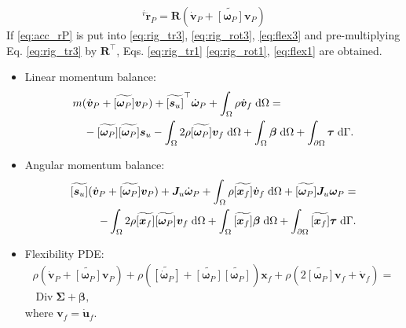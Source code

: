 \documentclass{svjour3}                     %
\DeclareMathOperator*{\Div}{Div}
\newcommand{\crmat}[1]{\ensuremath{\widetilde{\left[#1\right]}}}
\begin{document}
	\begin{equation}
	\label{eq:acc_rP}
	^{i}\ddot{\bm{r}}_P = \bm{R} \left(\dot{\bm{v}}_P + \crmat{\bm{\omega}_P} \bm{v}_P \right)
	\end{equation}
	If \eqref{eq:acc_rP} is put into \eqref{eq:rig_tr3}, \eqref{eq:rig_rot3}, \eqref{eq:flex3} and pre-multiplying  Eq. \eqref{eq:rig_tr3} by $\bm{R}^\top$, Eqs. \eqref{eq:rig_tr1} \eqref{eq:rig_rot1}, \eqref{eq:flex1} are obtained.
	\begin{itemize}
		\item Linear momentum balance:
		\begin{equation}
		\label{eq:rig_tr4}
		\begin{split}
		&m (\dot{\bm{v}}_P + \crmat{\bm{\omega}_P} \bm{v}_P) + \crmat{\bm{s}_u}^\top \dot{\bm{\omega}}_P  + \int_{\Omega} \rho \dot{\bm{v}}_f \d{\Omega} = \\
		&\quad - \crmat{\bm{\omega}_P} \crmat{\bm{\omega}_P} \bm{s}_u - \int_{\Omega} 2 \rho \crmat{\bm{\omega}_P} {\bm{v}}_f \d{\Omega} +  \int_{\Omega} \bm\beta \d{\Omega} + \int_{\partial \Omega} \bm\tau \d{\Gamma}.
		\end{split}
		\end{equation}
		\item Angular momentum balance:
		\begin{equation}
		\label{eq:rig_rot4}
		\begin{split}
		\crmat{\bm{s}_u} (\dot{\bm{v}}_P + \crmat{\bm{\omega}_P} \bm{v}_P) + \bm{J}_u \dot{\bm\omega}_P + \int_{\Omega} \rho \crmat{\bm{x}_f} \dot{\bm{v}}_f \d{\Omega} + \crmat{\bm{\omega}_P} \bm{J}_u \bm{\omega}_P = \\ 
		- \int_{\Omega} 2\rho \crmat{\bm{x}_f} \crmat{\bm\omega_P} {\bm{v}}_f \d{\Omega} + \int_{\Omega}\crmat{\bm{x}_f} \bm\beta \d{\Omega} + \int_{\partial \Omega}\crmat{\bm{x}_f} \bm\tau \d{\Gamma}. \\
		\end{split}
		\end{equation}
		\item Flexibility PDE:
		\begin{equation}
		\label{eq:flex4}
		\begin{split}
		\rho (\dot{\bm{v}}_P + \crmat{\bm\omega_P} \bm{v}_P) + \rho (\crmat{\dot{\bm\omega}_P} + \crmat{\bm{\omega}_P}\crmat{\bm{\omega}_P})\bm{x}_f + \rho (2 \crmat{\bm{\omega}_P} {\bm{v}}_f + \dot{\bm{v}}_f) = \\
		\Div{\bm\Sigma} + \bm\beta,
		\end{split}
		\end{equation}
		where $\bm{v}_f = \dot{\bm{u}}_f$.
	\end{itemize}
	
\end{document}
